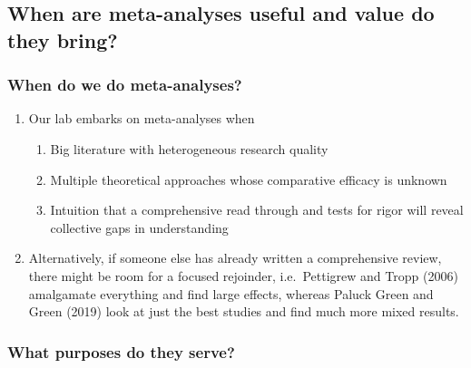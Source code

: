 \documentclass[
  man]{apa6}
\providecommand{\tightlist}{%
  \setlength{\itemsep}{0pt}\setlength{\parskip}{0pt}}
\begin{document}
\subsection{When are meta-analyses useful and value do they bring?}\label{when-are-meta-analyses-useful-and-value-do-they-bring}

\subsubsection{When do we do meta-analyses?}\label{when-do-we-do-meta-analyses}

\begin{enumerate}
\def\labelenumi{\arabic{enumi}.}
\tightlist
\item
  Our lab embarks on meta-analyses when

  \begin{enumerate}
  \def\labelenumii{\arabic{enumii}.}
  \tightlist
  \item
    Big literature with heterogeneous research quality
  \item
    Multiple theoretical approaches whose comparative efficacy is unknown
  \item
    Intuition that a comprehensive read through and tests for rigor will reveal collective gaps in understanding
  \end{enumerate}
\item
  Alternatively, if someone else has already written a comprehensive review, there might be room for a focused rejoinder, i.e.~Pettigrew and Tropp (2006) amalgamate everything and find large effects, whereas Paluck Green and Green (2019) look at just the best studies and find much more mixed results.
\end{enumerate}

\subsubsection{What purposes do they serve?}\label{what-purposes-do-they-serve}
\end{document}
